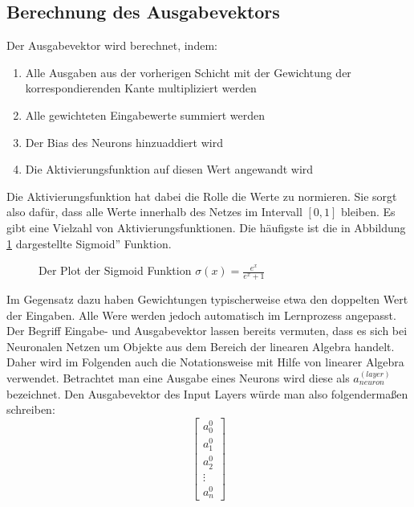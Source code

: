 \documentclass{article}
\begin{document}
\subsection{Berechnung des Ausgabevektors}
Der Ausgabevektor wird berechnet, indem:
\begin{enumerate}
	\item Alle Ausgaben aus der vorherigen Schicht mit der Gewichtung der korrespondierenden Kante multipliziert werden
	\item Alle gewichteten Eingabewerte summiert werden
	\item Der Bias des Neurons hinzuaddiert wird
	\item Die Aktivierungsfunktion auf diesen Wert angewandt wird
\end{enumerate}
Die Aktivierungsfunktion hat dabei die Rolle die Werte zu normieren. Sie sorgt also dafür, dass alle Werte innerhalb des Netzes im Intervall $[0, 1]$ bleiben. Es gibt eine Vielzahl von Aktivierungsfunktionen. Die häufigste ist die in Abbildung \ref{Sigmoid} dargestellte \glqq Sigmoid'' Funktion.
\begin{figure}[h]
\begin{center}
\end{center}
\caption{Der Plot der Sigmoid Funktion $\sigma(x)=\frac{e^x}{e^x+1}$}
\label{Sigmoid}
\end{figure}
\newline
Im Gegensatz dazu haben Gewichtungen typischerweise etwa den doppelten Wert der Eingaben. Alle Were werden jedoch automatisch im Lernprozess angepasst.
\newline
Der Begriff Eingabe- und Ausgabevektor lassen bereits vermuten, dass es sich bei Neuronalen Netzen um Objekte aus dem Bereich der linearen Algebra handelt. Daher wird im Folgenden auch die Notationsweise mit Hilfe von linearer Algebra verwendet. Betrachtet man eine Ausgabe eines Neurons wird diese als $a^ {(layer)}_{neuron}$ bezeichnet. Den Ausgabevektor des Input Layers würde man also folgendermaßen schreiben:
\begin{equation*}
\begin{bmatrix}
	a^0_0\\
	a^0_1\\
	a^0_2\\
	\vdots\\
	a^0_n
\end{bmatrix}
\end{equation*}
\end{document}
